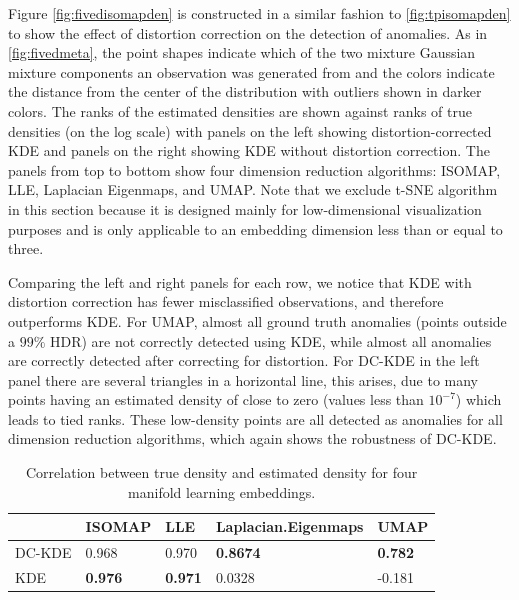 \documentclass[11pt,a4paper,]{article}
\begin{document}
Figure \autoref{fig:fivedisomapden} is constructed in a similar fashion to \autoref{fig:tpisomapden} to show the effect of distortion correction on the detection of anomalies. As in \autoref{fig:fivedmeta}, the point shapes indicate which of the two mixture Gaussian mixture components an observation was generated from and the colors indicate the distance from the center of the distribution with outliers shown in darker colors. The ranks of the estimated densities are shown against ranks of true densities (on the log scale) with panels on the left showing distortion-corrected KDE and panels on the right showing KDE without distortion correction. The panels from top to bottom show four dimension reduction algorithms: ISOMAP, LLE, Laplacian Eigenmaps, and UMAP. Note that we exclude t-SNE algorithm in this section because it is designed mainly for low-dimensional visualization purposes and is only applicable to an embedding dimension less than or equal to three.

Comparing the left and right panels for each row, we notice that KDE with distortion correction has fewer misclassified observations, and therefore outperforms KDE. For UMAP, almost all ground truth anomalies (points outside a \(99\%\) HDR) are not correctly detected using KDE, while almost all anomalies are correctly detected after correcting for distortion. For DC-KDE in the left panel there are several triangles in a horizontal line, this arises, due to many points having an estimated density of close to zero (values less than \(10^{-7}\)) which leads to tied ranks. These low-density points are all detected as anomalies for all dimension reduction algorithms, which again shows the robustness of DC-KDE.

\begin{table}

\caption{\label{tab:fivedcors}Correlation between true density and estimated density for four manifold learning embeddings.}
\centering
\begin{tabular}[t]{l>{}l>{}l>{}l>{}l}
\toprule
  & ISOMAP & LLE & Laplacian.Eigenmaps & UMAP\\
\midrule
DC-KDE & 0.968 & 0.970 & \textbf{0.8674} & \textbf{0.782}\\
KDE & \textbf{0.976} & \textbf{0.971} & 0.0328 & -0.181\\
\bottomrule
\end{tabular}
\end{table}
\end{document}
